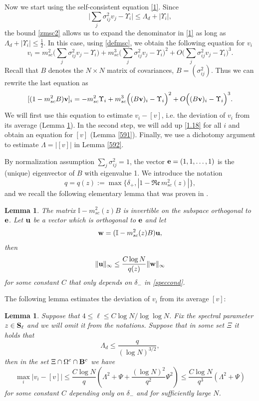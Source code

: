 \documentclass[draft]{article}
\newcommand{\bu}{{\bf{u}}}
\newcommand{\bv}{{\bf{v}}}
\newcommand{\bw}{{\bf{w}}}
\newcommand{\be}{\begin{equation}}
\newcommand{\ee}{\end{equation}}
\newcommand{\barv}{ {[ v ]}}
\newcommand{\re}{{\mathfrak{Re} \, }}
\newcommand{\bS}{ {\bf  S}}
\newtheorem{lemma}[theorem]{Lemma}
\newcommand{\qed}{\hfill\fbox{}\par\vspace{0.3mm}}
\numberwithin{equation}{section}
\numberwithin{theorem}{section}
\numberwithin{definition}{section}
\numberwithin{remark}{section}
\begin{document}
Now we start using the self-consistent equation \eqref{1}. 
Since 
$$
    \Big| \sum_j \sigma_{ij}^2 v_j - \Upsilon_i\Big| \le \Lambda_d + |\Upsilon_i|,
$$
the bound \eqref{zmsc2} allows us to expand the denominator in 
\eqref{1} as long as $ \Lambda_d + |\Upsilon_i| \le \frac{1}{2}$. 
In this case,
using \eqref{defmsc},  we obtain the following equation for $v_i$
\be\label{1.18}
 v_i =  m^2_{sc} \Big(\sum_{j}\sigma^2_{ij}v_j-\Upsilon_i\Big)+
m^3_{sc}\Big(\sum_{j}\sigma^2_{ij}v_j-\Upsilon_i\Big)^2+
  O \Big(\sum_{j}\sigma^2_{ij}v_j-\Upsilon_i\Big)^3 .
\ee
Recall that $B$ denotes the $N\times N$ matrix of covariances, $B= (\sigma_{ij}^2)$.
Thus we can rewrite the last equation as 
$$
 [(1 -  m^2_{sc} B) \bv ]_i =   - m^2_{sc} \Upsilon_i +
m^3_{sc}\Big( (B  \bv)_i-\Upsilon_i\Big)^2+
  O \Big( ( B \bv)_i -\Upsilon_i\Big)^3 .
$$ 
We will first use this equation  to estimate $v_i -\barv$, i.e. the deviation
of $v_i$ from its average (Lemma \ref{59}). In the second step,  we will 
add up \eqref{1.18} for all $i$ and obtain an equation
for $\barv$ (Lemma  \ref{591}). Finally, we use a dichotomy
argument to estimate $\Lambda= |\barv|$ in Lemma \ref{592}.


\medskip

{By normalization assumption $\sum_j \sigma^2_{ij}= 1$,    the vector ${\bf e}=(1,1,\ldots , 1)$
is the (unique) eigenvector of $B$ with  eigenvalue 1. }
We  introduce the notation
\be\label{defq}
 q=q(z):=\max\{\delta_+, |1-\re m^2_{sc}(z)|\},
\ee
and we recall  the following elementary lemma that was proven in \cite[Lemma 4.8]{EYY2}.




\begin{lemma}\label{infinf} The matrix $\mathbb I-m_{sc}^2(z)B$ is
invertible on the subspace orthogonal to ${\bf e}$. 
 Let  $\bf u$ be a vector which is  orthogonal to ${\bf e}$ and let
$$
   \bw = (\mathbb I-m_{sc}^2(z)B)\bu,
$$
then 
$$
\|{\bf u}\|_\infty\leq \frac{C\log N}{q(z)}\|{\bf w}\|_\infty
$$
for some constant $C$ that only depends on $\delta_-$ in \eqref{speccond}. \qed
\end{lemma}




The following lemma estimates the deviation of $v_i$ from its average $\barv$:


\begin{lemma}\label{59}  Suppose that $4\le \ell\le C\log N/\log\log N$.
 Fix  the spectral parameter $z\in \bS_\ell$ and
 we will omit it from the notations.
  Suppose that in some set $\Xi$ it holds that
 \be\label{342}
 \Lambda_d\le \frac{q}{(\log N)^{3/2}},
 \ee
 then  in the set  $\Xi\cap\Omega^c \cap {\bf B}^c$  we have  
\be\label{llld2}
\max_i\left|v_i-\barv\right|\leq 
 \frac{C \log N}{q}
\left(\Lambda^2 +  \Psi+ \frac{(\log N)^2}{q^2}\Psi^2\right)
\le  \frac{C \log N}{q^3}
\left(\Lambda^2 +  \Psi\right)
\ee
for some constant $C$  depending only on $\delta_-$
and for sufficiently large $N$.
\end{lemma}
\end{document}
